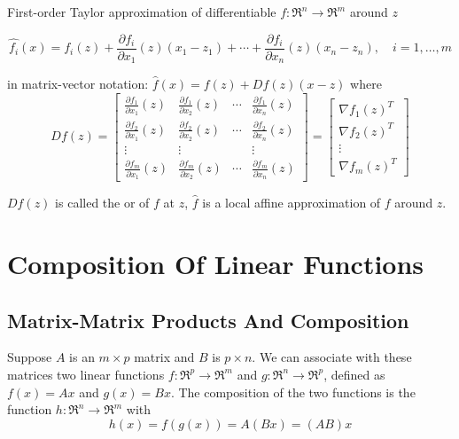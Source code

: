 \begin{theorem}
    First-order Taylor approximation of differentiable $ f: \mathfrak{R}^{n} \rightarrow \mathfrak{R}^{m} $ around $ z $

\begin{equation}
\hat{f_{i}}(x)=f_{i}(z)+\frac{\partial f_{i}}{\partial x_{1}}(z)\left(x_{1}-z_{1}\right)+\cdots+\frac{\partial f_{i}}{\partial x_{n}}(z)\left(x_{n}-z_{n}\right), \quad i=1, \ldots, m
\end{equation}

in matrix-vector notation: $ \hat{f}(x)=f(z)+D f(z)(x-z) $ where
\begin{equation}
D f(z)=\left[\begin{array}{cccc}
\frac{\partial f_{1}}{\partial x_{1}}(z) & \frac{\partial f_{1}}{\partial x_{2}}(z) & \cdots & \frac{\partial f_{1}}{\partial x_{n}}(z) \\
\frac{\partial f_{2}}{\partial x_{1}}(z) & \frac{\partial f_{2}}{\partial x_{2}}(z) & \cdots & \frac{\partial f_{2}}{\partial x_{n}}(z) \\
\vdots & \vdots & & \vdots \\
\frac{\partial f_{m}}{\partial x_{1}}(z) & \frac{\partial f_{m}}{\partial x_{2}}(z) & \cdots & \frac{\partial f_{m}}{\partial x_{n}}(z)
\end{array}\right]=\left[\begin{array}{c}
\nabla f_{1}(z)^{T} \\
\nabla f_{2}(z)^{T} \\
\vdots \\
\nabla f_{m}(z)^{T}
\end{array}\right]
\end{equation}

$ D f(z) $ is called the  or  of $ f $ at $ z $, $ \hat{f} $ is a local affine approximation of $ f $ around $ z $.
\end{theorem}

\section{Composition Of Linear Functions}

\subsection{Matrix-Matrix Products And Composition}

Suppose $ A $ is an $ m \times p $ matrix and $ B $ is $ p \times n $. We can associate with these matrices two linear functions $ f: \mathfrak{R}^{p} \rightarrow \mathfrak{R}^{m} $ and $ g: \mathfrak{R}^{n} \rightarrow \mathfrak{R}^{p} $, defined as $ f(x)=A x $ and $ g(x)=B x $. The composition of the two functions is the function $ h: \mathfrak{R}^{n} \rightarrow \mathfrak{R}^{m} $ with
\begin{equation}
h(x)=f(g(x))=A(B x)=(A B) x
\end{equation}

